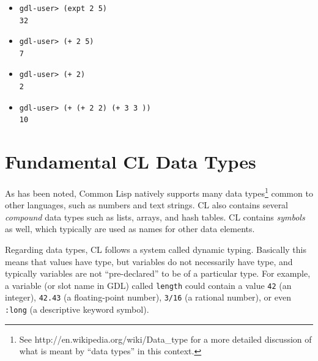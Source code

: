 \documentclass [11pt]{book}
\begin{document}
\begin{itemize}
\begin{itemize}

\item 

\begin{verbatim}gdl-user> (expt 2 5)
32
\end{verbatim}

\item 

\begin{verbatim}gdl-user> (+ 2 5)
7
\end{verbatim}

\item 

\begin{verbatim}gdl-user> (+ 2)
2
\end{verbatim}

\item 

\begin{verbatim}gdl-user> (+ (+ 2 2) (+ 3 3 ))
10
\end{verbatim}

\end{itemize}



\end{itemize}





\section{Fundamental CL Data Types}

\label{sec:fundamentalcldatatypes}



As has been noted, Common Lisp natively supports many data
types\footnote{See http://en.wikipedia.org/wiki/Data\_type for
a more detailed discussion of what is meant by ``data types'' in this
context.} common to other languages, such as numbers and text strings. CL
also contains several \emph{compound} data types such as lists, arrays, and hash tables. CL
contains \emph{symbols} as well, which typically are used as names for other data elements.



Regarding data types, CL follows a system called dynamic
typing. Basically this means that values have type, but variables do
not necessarily have type, and typically variables are not
``pre-declared'' to be of a particular type. For example, a
variable (or slot name in GDL) called \texttt{length} could contain a value \texttt{42} (an integer), \texttt{42.43} (a floating-point number), \texttt{3/16} (a rational number), or even \texttt{:long} (a descriptive keyword symbol).
\end{document}
